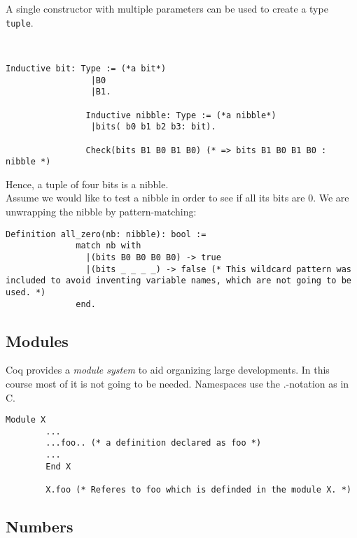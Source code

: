 	    A single constructor with multiple parameters can be used to create a type \lstinline! tuple!.
		\begin{example}~\\\vspace{-10mm}
	 	 	{\normalfont \begin{lstlisting}[caption = \lstinline!bit! and \lstinline!nibbel!]
	 	 		Inductive bit: Type := (*a bit*) 
	 	 		 |B0
	 	 		 |B1.
	 	 		 
	 		    Inductive nibble: Type := (*a nibble*)
	 		   	 |bits( b0 b1 b2 b3: bit).
	 		   			 	
	 		   	Check(bits B1 B0 B1 B0) (* => bits B1 B0 B1 B0 : nibble *)
	 		\end{lstlisting}
	 		Hence, a tuple of four bits is a nibble.\\ 		
	 		Assume we would like to test a nibble in order to see if all its bits are 0. 
	 		We are unwrapping the nibble by pattern-matching:
	 		\begin{lstlisting}[caption = \lstinline!all_zero!]
	 		Definition all_zero(nb: nibble): bool :=
	 		  match nb with
	 	  	    |(bits B0 B0 B0 B0) -> true
	 		    |(bits _ _ _ _) -> false (* This wildcard pattern was included to avoid inventing variable names, which are not going to be used. *) 
	 		  end.
	 		 \end{lstlisting}}
	 	\end{example}
	 	
	\subsection{Modules}
	
		Coq provides a {\itshape module system} to aid organizing large developments.
		In this course most of it is not going to be needed. Namespaces use the $.$-notation as in C.
	
		\begin{lstlisting}[caption = \lstinline!Module!]
		Module X 
		...
		...foo.. (* a definition declared as foo *)
		...
		End X
		
		X.foo (* Referes to foo which is definded in the module X. *)
		\end{lstlisting}
		
	\subsection{Numbers}
	
